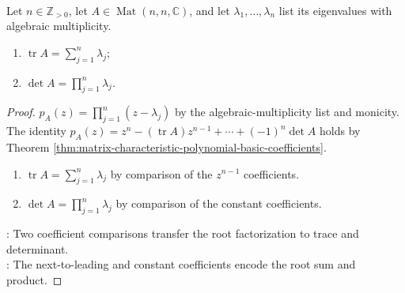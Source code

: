 \begin{proposition} \label{prop:trace-determinant-from-eigenvalues} \\
Let $n\in\mathbb{Z}_{>0}$, let $A\in\operatorname{Mat}(n,n,\mathbb{C})$, and let $\lambda_1,\ldots,\lambda_n$ list its eigenvalues with algebraic multiplicity.
\begin{enumerate}[label=(\roman*)]
\setlength{\itemsep}{0pt}
\item $\operatorname{tr}A=\sum\limits_{j=1}^{n}\lambda_j$;
\item $\det A=\prod\limits_{j=1}^{n}\lambda_j$.
\end{enumerate}
\begin{proof}
$p_A(z)=\prod\limits_{j=1}^{n}(z-\lambda_j)$ by the algebraic-multiplicity list and monicity.\\
The identity $p_A(z)=z^n-(\operatorname{tr}A)z^{n-1}+\cdots+(-1)^n\det A$ holds by Theorem \ref{thm:matrix-characteristic-polynomial-basic-coefficients}.
\begin{enumerate}[label=(\roman*)]
\setlength{\itemsep}{0pt}
\item $\operatorname{tr}A=\sum\limits_{j=1}^{n}\lambda_j$ by comparison of the $z^{n-1}$ coefficients.
\item $\det A=\prod\limits_{j=1}^{n}\lambda_j$ by comparison of the constant coefficients.
\end{enumerate}
: Two coefficient comparisons transfer the root factorization to trace and determinant.\\
: The next-to-leading and constant coefficients encode the root sum and product.
\end{proof}
\end{proposition}

